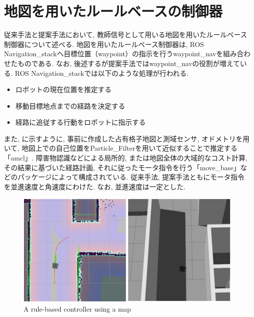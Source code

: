 
\section{地図を用いたルールベースの制御器}
従来手法と提案手法において, 教師信号として用いる地図を用いたルールベース制御器について述べる. 地図を用いたルールベース制御器は, ROS Navigation\_stack\cite{navigation:online}へ目標位置（waypoint）の指示を行うwaypoint\_nav\cite{waypoint_nav:online}を組み合わせたものである. なお, 後述するが提案手法ではwaypoint\_navの役割が増えている. ROS Navigation\_stackでは以下のような処理が行われる. 

\begin{itemize}
  \item ロボットの現在位置を推定する
  \item 移動目標地点までの経路を決定する
  \item 経路に追従する行動をロボットに指示する
\end{itemize}

また, に示すように, 事前に作成した占有格子地図と測域センサ, オドメトリを用いて, 地図上での自己位置をParticle\_Filterを用いて近似することで推定する「amcl」. 障害物認識などによる局所的, または地図全体の大域的なコスト計算, その結果に基づいた経路計画, それに従ったモータ指令を行う「move\_base」などのパッケージによって構成されている. 従来手法, 提案手法ともにモータ指令を並進速度と角速度にわけた. なお, 並進速度は一定とした.


\begin{figure}[hbtp]
  \centering
 \includegraphics[keepaspectratio, scale=0.7]
      {images/rule-based.png}
 \caption{A rule-based controller using a map}
 \label{Fig:navigation}
\end{figure}

\newpage